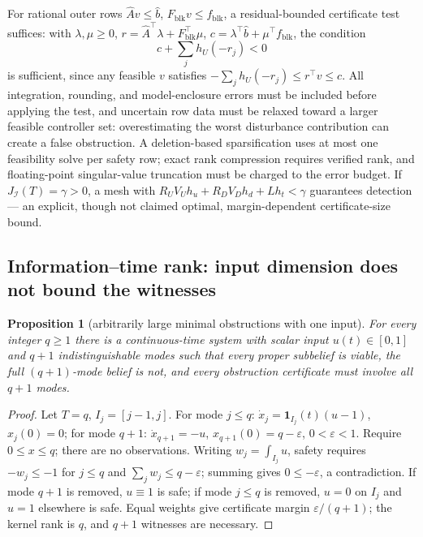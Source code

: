 \documentclass[10pt,twocolumn]{article}
\theoremstyle{plain}
\newtheorem{proposition}[theorem]{Proposition}
\theoremstyle{definition}
\theoremstyle{remark}
\begin{document}
For rational outer rows \(\widehat A v \le \widehat b\),
\(F_{\mathrm{blk}} v \le f_{\mathrm{blk}}\), a residual-bounded certificate
test suffices: with \(\lambda, \mu \ge 0\),
\(r = \widehat A^\top \lambda + F_{\mathrm{blk}}^\top \mu\),
\(c = \lambda^\top \widehat b + \mu^\top f_{\mathrm{blk}}\), the condition
\[
c + \sum_j h_U(-r_j) < 0
\tag{11}
\]
is sufficient, since any feasible \(v\) satisfies
\(-\sum_j h_U(-r_j) \le r^\top v \le c\). All integration, rounding, and
model-enclosure errors must be included before applying the test, and
uncertain row data must be relaxed toward a larger feasible controller set:
overestimating the worst disturbance contribution can create a false
obstruction. A deletion-based sparsification uses at most one feasibility
solve per safety row; exact rank compression requires verified rank, and
floating-point singular-value truncation must be charged to the error budget.
If \(J_{\mathcal{I}}(T) = \gamma > 0\), a mesh with
\(R_U V_U h_u + R_D V_D h_d + L h_t < \gamma\) guarantees detection --- an
explicit, though not claimed optimal, margin-dependent certificate-size
bound.

\subsection{Information--time rank: input dimension does not bound the witnesses}\label{rank}

\begin{proposition}[arbitrarily large minimal obstructions with one input]\label{prop:rank}
For every integer \(q \ge 1\) there is a continuous-time system with scalar
input \(u(t) \in [0,1]\) and \(q+1\) indistinguishable modes such that every
proper subbelief is viable, the full \((q{+}1)\)-mode belief is not, and
every obstruction certificate must involve all \(q+1\) modes.
\end{proposition}

\begin{proof}
Let \(T = q\), \(I_j = [j-1, j]\). For mode \(j \le q\):
\(\dot x_j = \mathbf{1}_{I_j}(t)(u - 1)\), \(x_j(0) = 0\); for mode \(q+1\):
\(\dot x_{q+1} = -u\), \(x_{q+1}(0) = q - \varepsilon\), \(0 < \varepsilon <
1\). Require \(0 \le x \le q\); there are no observations. Writing
\(w_j = \int_{I_j} u\), safety requires \(-w_j \le -1\) for \(j \le q\) and
\(\sum_j w_j \le q - \varepsilon\); summing gives \(0 \le -\varepsilon\), a
contradiction. If mode \(q+1\) is removed, \(u \equiv 1\) is safe; if mode
\(j \le q\) is removed, \(u = 0\) on \(I_j\) and \(u = 1\) elsewhere is
safe. Equal weights give certificate margin \(\varepsilon/(q+1)\); the
kernel rank is \(q\), and \(q+1\) witnesses are necessary.
\end{proof}
\end{document}
